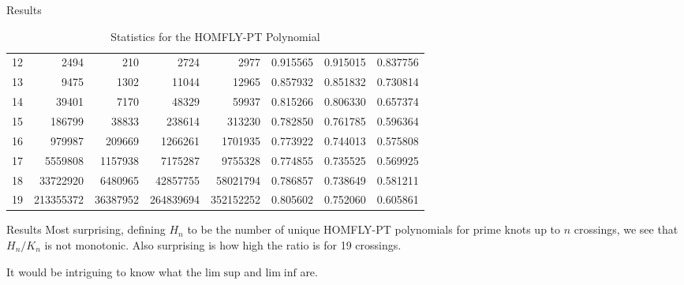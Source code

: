 \documentclass{beamer}
\begin{document}
\begin{frame}{Results}
\begin{table}
{\begin{tabular}{| r | r | r | r | r | r | r | r |}
                    12 &      2494 &      210 &      2724 &      2977 & 0.915565 & 0.915015 & 0.837756\\
                    13 &      9475 &     1302 &     11044 &     12965 & 0.857932 & 0.851832 & 0.730814\\
                    14 &     39401 &     7170 &     48329 &     59937 & 0.815266 & 0.806330 & 0.657374\\
                    15 &    186799 &    38833 &    238614 &    313230 & 0.782850 & 0.761785 & 0.596364\\
                    16 &    979987 &   209669 &   1266261 &   1701935 & 0.773922 & 0.744013 & 0.575808\\
                    17 &   5559808 &  1157938 &   7175287 &   9755328 & 0.774855 & 0.735525 & 0.569925\\
                    18 &  33722920 &  6480965 &  42857755 &  58021794 & 0.786857 & 0.738649 & 0.581211\\
                    19 & 213355372 & 36387952 & 264839694 & 352152252 & 0.805602 & 0.752060 & 0.605861\\
                    \hline
                \end{tabular}
            }
            \caption{Statistics for the HOMFLY-PT Polynomial}
        \end{table}
    \end{frame}
    \begin{frame}{Results}
        Most surprising, defining $H_{n}$ to be the number of unique
        HOMFLY-PT polynomials for prime knots up to $n$ crossings, we see that
        $H_{n}/K_{n}$ is not monotonic. Also surprising is how high the ratio
        is for 19 crossings.
        \par\hfill\par
        It would be intriguing to know what the
        $\textrm{lim}\;\textrm{sup}$ and $\textrm{lim}\;\textrm{inf}$ are.
    \end{frame}
\end{document}
